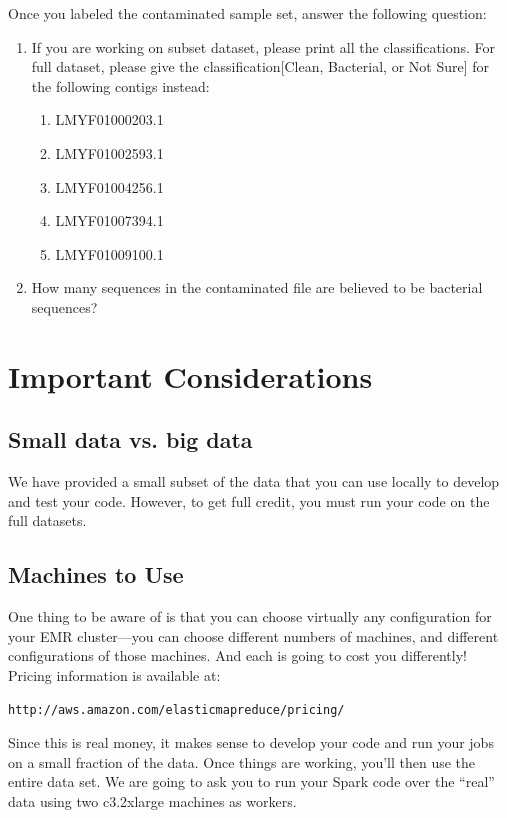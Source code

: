\documentclass[11pt]{article}
\renewcommand\:{\colon} %
\begin{document}
Once you labeled the contaminated sample set, answer the following question:
\begin{enumerate}
\item If you are working on subset dataset, please print all the classifications. For full dataset, please give the classification[Clean, Bacterial, or Not Sure] for the following contigs instead:
\begin{enumerate}
\item LMYF01000203.1
\item LMYF01002593.1
\item LMYF01004256.1
\item LMYF01007394.1
\item LMYF01009100.1
\end{enumerate}

\item How many sequences in the contaminated file are believed to be bacterial sequences?

\end{enumerate}



\section{Important Considerations}

\subsection{Small data vs. big data}
We have provided a small subset of the data that you can use locally to develop and test your code.
However, to get full credit, you must run your code on the full datasets.

\subsection{Machines to Use}

One thing to be aware of is that you can choose virtually any configuration for your EMR cluster---you can choose different numbers
of machines, and different configurations of those machines.  And each is going to cost you differently!  Pricing information
is available at:

\vspace{10 pt}
{\footnotesize\texttt{http://aws.amazon.com/elasticmapreduce/pricing/}}  

\vspace{10 pt}
Since this is real money, it makes sense to 
develop your code and run your jobs on a small fraction of the data.
Once things are working, you'll then use the entire data set.
We are going to ask you to run your Spark code over the ``real'' data using two c3.2xlarge machines as
workers.
\end{document}
